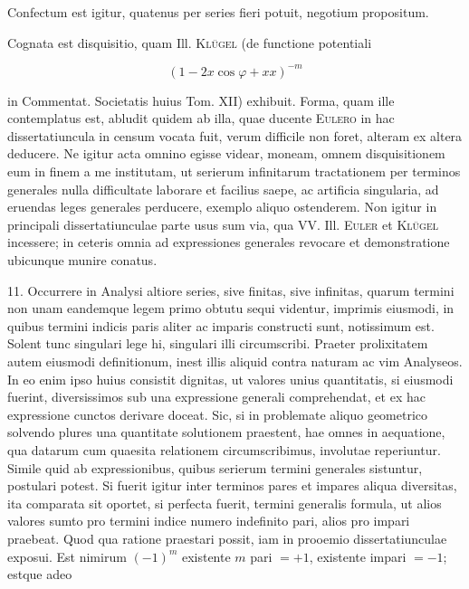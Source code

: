 Confectum est igitur, quatenus per series fieri potuit, negotium propositum.

Cognata est disquisitio, quam Ill. \textsc{Kl\"ugel} (de functione potentiali

\[
(1-2x\cos\varphi+xx)^{-m}
\]

\noindent in Commentat. Societatis huius Tom. XII) exhibuit. Forma, quam ille contemplatus
est, abludit quidem ab illa, quae ducente \textsc{Eulero} in hac dissertatiuncula in censum
vocata fuit, verum difficile non foret, alteram ex altera deducere. Ne igitur acta
omnino egisse videar, moneam, omnem disquisitionem eum in finem a me institutam,
ut serierum infinitarum tractationem per terminos generales nulla difficultate laborare
et facilius saepe, ac artificia singularia, ad eruendas leges generales perducere,
exemplo aliquo ostenderem. Non igitur in principali dissertatiunculae parte usus sum
via, qua VV. Ill. \textsc{Euler} et \textsc{Kl\"ugel} incessere; in ceteris omnia ad expressiones generales
revocare et demonstratione ubicunque munire conatus.


11. Occurrere in Analysi altiore series, sive finitas, sive infinitas, quarum termini
non unam eandemque legem primo obtutu sequi videntur, imprimis eiusmodi, in
quibus termini indicis paris aliter ac imparis constructi sunt, notissimum est. Solent
tunc singulari lege hi, singulari illi circumscribi. Praeter prolixitatem autem eiusmodi
definitionum, inest illis aliquid contra naturam ac vim Analyseos. In eo enim ipso
huius consistit dignitas, ut valores unius quantitatis, si eiusmodi fuerint, diversissimos
sub una expressione generali comprehendat, et ex hac expressione cunctos derivare
doceat. Sic, si in problemate aliquo geometrico solvendo plures una quantitate
solutionem praestent, hae omnes in aequatione, qua datarum cum quaesita relationem
circumscribimus, involutae reperiuntur. Simile quid ab expressionibus, quibus serierum
termini generales sistuntur, postulari potest. Si fuerit igitur inter terminos pares et
impares aliqua diversitas, ita comparata sit oportet, si perfecta fuerit, termini generalis
formula, ut alios valores sumto pro termini indice numero indefinito pari, alios pro
impari praebeat. Quod qua ratione praestari possit, iam in prooemio dissertatiunculae
exposui. Est nimirum $(-1)^m$ existente $m$ pari $=+1$, existente impari $=-1$; estque adeo
